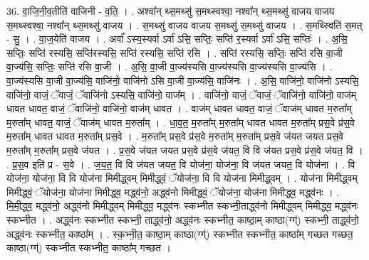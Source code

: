 \documentclass[17pt]{extarticle}
\begin{document}
36. वा॒जि॒नी॒व॒तीति॑ वाजिनी - व॒ति॒ । . अश्वा᳚न् थ्स॒मथ्सु॑ स॒मथ्स्वश्वा॒ नश्वा᳚न् थ्स॒मथ्सु॑ वाजय वाजय स॒मथ्स्वश्वा॒ नश्वा᳚न् थ्स॒मथ्सु॑ वाजय । . स॒मथ्सु॑ वाजय वाजय स॒मथ्सु॑ स॒मथ्सु॑ वाजय । . स॒मथ्स्विति॑ स॒मत् - सु॒ । . वा॒ज॒येति॑ वाजय । . अर्वा᳚ ऽस्य॒स्यर्वा ऽर्वा॑ ऽसि॒ सप्तिः॒ सप्ति॑ र॒स्यर्वा ऽर्वा॑ ऽसि॒ सप्तिः॑ । . अ॒सि॒ सप्तिः॒ सप्ति॑ रस्यसि॒ सप्ति॑रस्यसि॒ सप्ति॑ रस्यसि॒ सप्ति॑ रसि । . सप्ति॑ रस्यसि॒ सप्तिः॒ सप्ति॑ रसि वा॒जी वा॒ज्य॑सि॒ सप्तिः॒ सप्ति॑ रसि वा॒जी । . अ॒सि॒ वा॒जी वा॒ज्य॑स्यसि वा॒ज्य॑स्यसि वा॒ज्य॑स्यसि वा॒ज्य॑सि । . वा॒ज्य॑स्यसि वा॒जी वा॒ज्य॑सि॒ वाजि॑नो॒ वाजि॑नो ऽसि वा॒जी वा॒ज्य॑सि॒ वाजि॑नः । . अ॒सि॒ वाजि॑नो॒ वाजि॑नो ऽस्यसि॒ वाजि॑नो॒ वाजं॒ ॅवाजं॒ ॅवाजि॑नो ऽस्यसि॒ वाजि॑नो॒ वाज᳚म् । . वाजि॑नो॒ वाजं॒ ॅवाजं॒ ॅवाजि॑नो॒ वाजि॑नो॒ वाज॑म् धावत धावत॒ वाजं॒ ॅवाजि॑नो॒ वाजि॑नो॒ वाज॑म् धावत । . वाज॑म् धावत धावत॒ वाजं॒ ॅवाज॑म् धावत म॒रुता᳚म् म॒रुता᳚म् धावत॒ वाजं॒ ॅवाज॑म् धावत म॒रुता᳚म् । . धा॒व॒त॒ म॒रुता᳚म् म॒रुता᳚म् धावत धावत म॒रुता᳚म् प्रस॒वे प्र॑स॒वे म॒रुता᳚म् धावत धावत म॒रुता᳚म् प्रस॒वे । . म॒रुता᳚म् प्रस॒वे प्र॑स॒वे म॒रुता᳚म् म॒रुता᳚म् प्रस॒वे ज॑यत जयत प्रस॒वे म॒रुता᳚म् म॒रुता᳚म् प्रस॒वे ज॑यत । . प्र॒स॒वे ज॑यत जयत प्रस॒वे प्र॑स॒वे ज॑यत॒ वि वि ज॑यत प्रस॒वे प्र॑स॒वे ज॑यत॒ वि । . प्र॒स॒व इति॑ प्र - स॒वे । . ज॒य॒त॒ वि वि ज॑यत जयत॒ वि योज॑ना॒ योज॑ना॒ वि ज॑यत जयत॒ वि योज॑ना । . वि योज॑ना॒ योज॑ना॒ वि वि योज॑ना मिमीद्ध्वम् मिमीद्ध्वं॒ ॅयोज॑ना॒ वि वि योज॑ना मिमीद्ध्वम् । . योज॑ना मिमीद्ध्वम् मिमीद्ध्वं॒ ॅयोज॑ना॒ योज॑ना मिमीद्ध्व॒ मद्ध्व॑नो॒ अद्ध्व॑नो मिमीद्ध्वं॒ ॅयोज॑ना॒ योज॑ना मिमीद्ध्व॒ मद्ध्व॑नः । . मि॒मी॒द्ध्व॒ मद्ध्व॑नो॒ अद्ध्व॑नो मिमीद्ध्वम् मिमीद्ध्व॒ मद्ध्व॑नः स्कभ्नीत स्कभ्नी॒ताद्ध्व॑नो मिमीद्ध्वम् मिमीद्ध्व॒ मद्ध्व॑नः स्कभ्नीत । . अद्ध्व॑नः स्कभ्नीत स्कभ्नी॒ ताद्ध्व॑नो॒ अद्ध्व॑नः स्कभ्नीत॒ काष्ठा॒म् काष्ठा(ग्ग्॑) स्कभ्नी॒ ताद्ध्व॑नो॒ अद्ध्व॑नः स्कभ्नीत॒ काष्ठा᳚म् । . स्क॒भ्नी॒त॒ काष्ठा॒म् काष्ठा(ग्ग्॑) स्कभ्नीत स्कभ्नीत॒ काष्ठा᳚म् गच्छत गच्छत॒ काष्ठा(ग्ग्॑) स्कभ्नीत स्कभ्नीत॒ काष्ठा᳚म् गच्छत । \newline
\pagebreak
{}
\end{document}

